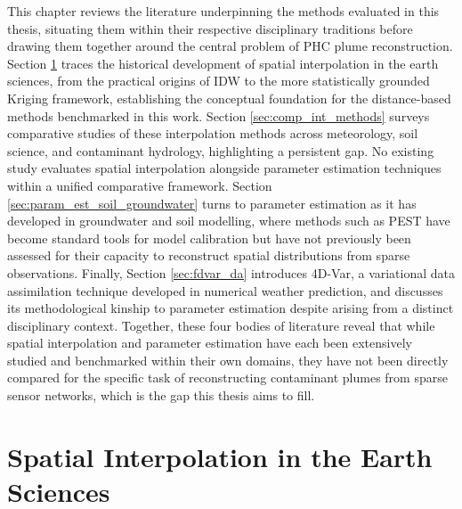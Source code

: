 \label{chapter:related_literature}

This chapter reviews the literature underpinning the methods evaluated in this thesis, situating them within their respective disciplinary traditions before drawing them together around the central problem of PHC plume reconstruction. Section \ref{sec:spat_int_earthSciences} traces the historical development of spatial interpolation in the earth sciences, from the practical origins of IDW to the more statistically grounded Kriging framework, establishing the conceptual foundation for the distance-based methods benchmarked in this work. Section \ref{sec:comp_int_methods} surveys comparative studies of these interpolation methods across meteorology, soil science, and contaminant hydrology, highlighting a persistent gap. No existing study evaluates spatial interpolation alongside parameter estimation techniques within a unified comparative framework. Section \ref{sec:param_est_soil_groundwater} turns to parameter estimation as it has developed in groundwater and soil modelling, where methods such as PEST have become standard tools for model calibration but have not previously been assessed for their capacity to reconstruct spatial distributions from sparse observations. Finally, Section \ref{sec:fdvar_da} introduces 4D-Var, a variational data assimilation technique developed in numerical weather prediction, and discusses its methodological kinship to parameter estimation despite arising from a distinct disciplinary context. Together, these four bodies of literature reveal that while spatial interpolation and parameter estimation have each been extensively studied and benchmarked within their own domains, they have not been directly compared for the specific task of reconstructing contaminant plumes from sparse sensor networks, which is the gap this thesis aims to fill.

\section{Spatial Interpolation in the Earth Sciences}
\label{sec:spat_int_earthSciences}

